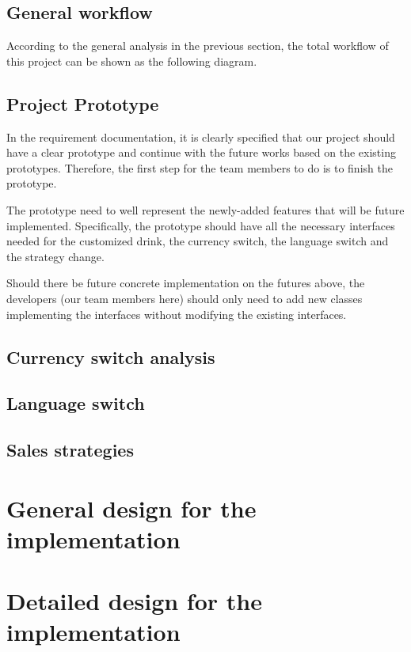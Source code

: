 \documentclass[a4paper]{report}
\begin{document}
\section{General workflow}
According to the general analysis in the previous section, the total workflow of this project can be shown as the following diagram.

\section{Project Prototype}
In the requirement documentation, it is clearly specified that our project should have a clear prototype and continue with the future works based on the existing prototypes. Therefore, the first step for the team members to do is to finish the prototype. 
\par
The prototype need to well represent the newly-added features that will be future implemented. Specifically, the prototype should have all the necessary interfaces needed for the customized drink, the currency switch, the language switch and the strategy change.
\par
Should there be future concrete implementation on the futures above, the developers (our team members here) should only need to add new classes implementing the interfaces without modifying the existing interfaces.
\section{Currency switch analysis}



\section{Language switch}


\section{Sales strategies}





\chapter{General design for the implementation}



\chapter{Detailed design for the implementation}
\end{document}
